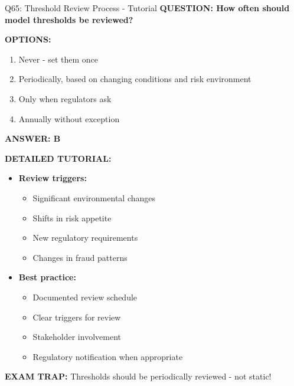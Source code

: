 \documentclass[8pt]{beamer}
\begin{document}
	\begin{frame}{Q65: Threshold Review Process - Tutorial}
		\fontsize{6.5}{7.5}\selectfont
		\textbf{QUESTION: How often should model thresholds be reviewed?}
		
		\vspace{0.1cm}
		\textbf{OPTIONS:}
		\begin{enumerate}
			\item Never - set them once
			\item Periodically, based on changing conditions and risk environment
			\item Only when regulators ask
			\item Annually without exception
		\end{enumerate}
		
		\vspace{0.1cm}
		\textcolor{myblue}{\textbf{ANSWER: B}}
		
		\vspace{0.1cm}
		\textbf{DETAILED TUTORIAL:}
		\begin{itemize}
			\item \textbf{Review triggers:}
			\begin{itemize}
				\item Significant environmental changes
				\item Shifts in risk appetite
				\item New regulatory requirements
				\item Changes in fraud patterns
			\end{itemize}
			\item \textbf{Best practice:}
			\begin{itemize}
				\item Documented review schedule
				\item Clear triggers for review
				\item Stakeholder involvement
				\item Regulatory notification when appropriate
			\end{itemize}
		\end{itemize}
		
		\textcolor{myred}{\textbf{EXAM TRAP:}} Thresholds should be \textcolor{myblue}{periodically reviewed} - not static!
	\end{frame}
	
	
\end{document}
